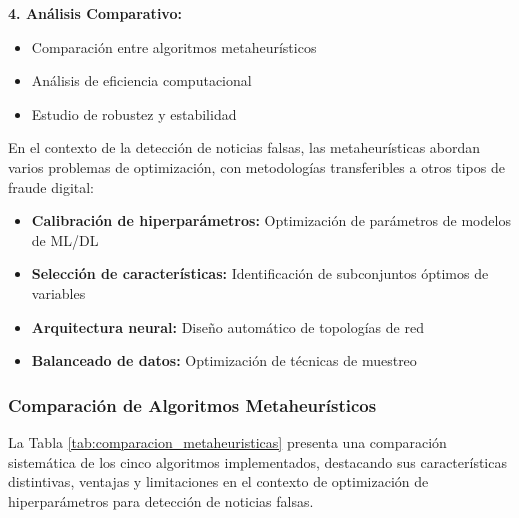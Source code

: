 \textbf{4. Análisis Comparativo:}
\begin{itemize}
    \item Comparación entre algoritmos metaheurísticos
    \item Análisis de eficiencia computacional
    \item Estudio de robustez y estabilidad
\end{itemize}

En el contexto de la detección de noticias falsas, las metaheurísticas abordan varios problemas de optimización, con metodologías transferibles a otros tipos de fraude digital:
\begin{itemize}
    \item \textbf{Calibración de hiperparámetros:} Optimización de parámetros de modelos de ML/DL
    \item \textbf{Selección de características:} Identificación de subconjuntos óptimos de variables
    \item \textbf{Arquitectura neural:} Diseño automático de topologías de red
    \item \textbf{Balanceado de datos:} Optimización de técnicas de muestreo
\end{itemize}

\subsubsection{Comparación de Algoritmos Metaheurísticos}

La Tabla \ref{tab:comparacion_metaheuristicas} presenta una comparación sistemática de los cinco algoritmos implementados, destacando sus características distintivas, ventajas y limitaciones en el contexto de optimización de hiperparámetros para detección de noticias falsas.

